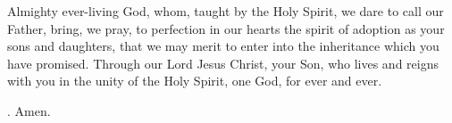 \lettrine[lines=3]{A}{}lmighty ever-living God,
whom, taught by the Holy Spirit,
we dare to call our Father,
bring, we pray, to perfection in our hearts
the spirit of adoption as your sons and daughters,
that we may merit to enter into the inheritance
which you have promised.
Through our Lord Jesus Christ, your Son,
who lives and reigns with you in the unity of the Holy Spirit,
one God, for ever and ever. \par \Rbar. Amen.
